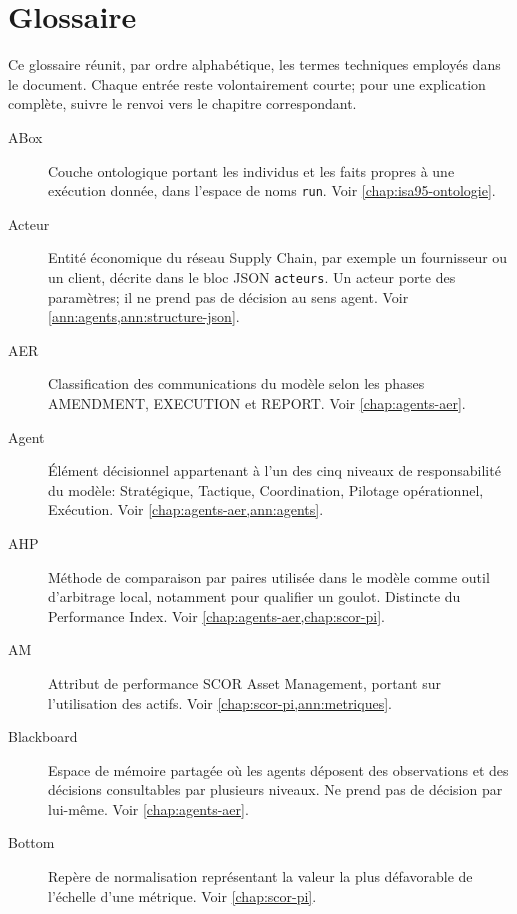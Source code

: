 \chapter{Glossaire}
\label{ann:glossaire}

Ce glossaire réunit, par ordre alphabétique, les termes techniques employés dans le document. Chaque entrée reste volontairement courte; pour une explication complète, suivre le renvoi vers le chapitre correspondant.

\begin{description}

\item[ABox] Couche ontologique portant les individus et les faits propres à une exécution donnée, dans l'espace de noms \texttt{run}. Voir \cref{chap:isa95-ontologie}.

\item[Acteur] Entité économique du réseau Supply Chain, par exemple un fournisseur ou un client, décrite dans le bloc JSON \texttt{acteurs}. Un acteur porte des paramètres; il ne prend pas de décision au sens agent. Voir \cref{ann:agents,ann:structure-json}.

\item[AER] Classification des communications du modèle selon les phases AMENDMENT, EXECUTION et REPORT. Voir \cref{chap:agents-aer}.

\item[Agent] Élément décisionnel appartenant à l'un des cinq niveaux de responsabilité du modèle: Stratégique, Tactique, Coordination, Pilotage opérationnel, Exécution. Voir \cref{chap:agents-aer,ann:agents}.

\item[AHP] Méthode de comparaison par paires utilisée dans le modèle comme outil d'arbitrage local, notamment pour qualifier un goulot. Distincte du Performance Index. Voir \cref{chap:agents-aer,chap:scor-pi}.

\item[AM] Attribut de performance SCOR Asset Management, portant sur l'utilisation des actifs. Voir \cref{chap:scor-pi,ann:metriques}.

\item[Blackboard] Espace de mémoire partagée où les agents déposent des observations et des décisions consultables par plusieurs niveaux. Ne prend pas de décision par lui-même. Voir \cref{chap:agents-aer}.

\item[Bottom] Repère de normalisation représentant la valeur la plus défavorable de l'échelle d'une métrique. Voir \cref{chap:scor-pi}.


\end{description}
